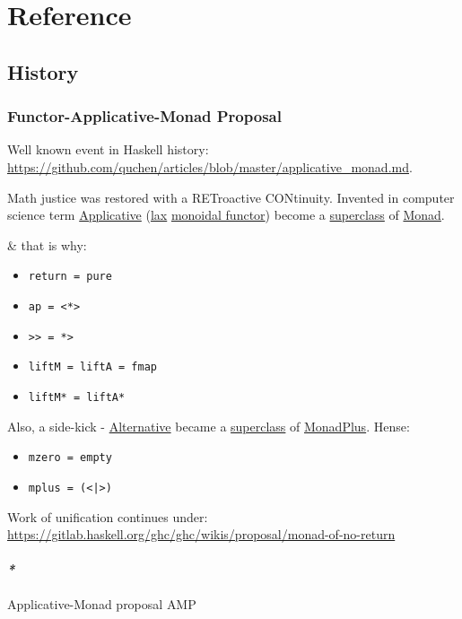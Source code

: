 \documentclass[a4paper,14pt,oneside]{book}
\begin{document}
\part{Reference}
\label{sec:org4446522}

\chapter{History}
\label{sec:orgc22b56b}
\section{\label{org519828c}Functor-Applicative-Monad Proposal}
\label{sec:org841be4d}
Well known event in Haskell history: \url{https://github.com/quchen/articles/blob/master/applicative\_monad.md}.

Math justice was restored with a RETroactive CONtinuity. Invented in computer science term \hyperref[org356ce24]{Applicative} (\hyperref[org8e6624a]{lax} \hyperref[org7518794]{monoidal functor}) become a \hyperref[orgd57b8cd]{superclass} of \hyperref[org360d23d]{Monad}.

\& that is why:
\begin{itemize}
\item \texttt{return = pure}
\item \texttt{ap = <*>}
\item \texttt{>> = *>}
\item \texttt{liftM = liftA = fmap}
\item \texttt{liftM* = liftA*}
\end{itemize}

Also, a side-kick - \hyperref[org44e0633]{Alternative} became a \hyperref[orgd57b8cd]{superclass} of \hyperref[org2a98243]{MonadPlus}. Hense:
\begin{itemize}
\item \texttt{mzero = empty}
\item \texttt{mplus = (<|>)}
\end{itemize}

Work of unification continues under: \url{https://gitlab.haskell.org/ghc/ghc/wikis/proposal/monad-of-no-return}

\subsection{\emph{*}}
\label{sec:org181d053}

\label{org9527271}Applicative-Monad proposal
\label{org6ffaa4a}AMP
\end{document}
